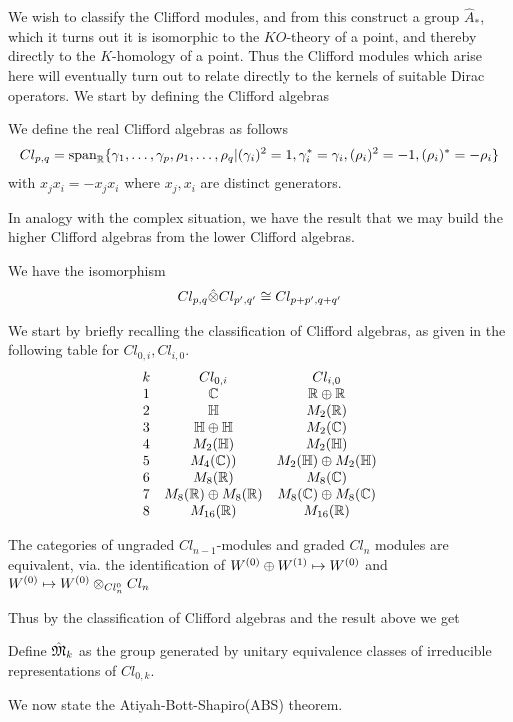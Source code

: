 We wish to classify the Clifford modules, and from this construct a group $\hat{A}_*$, which it turns out it is isomorphic to the $KO$-theory of a point, and thereby directly to the $K$-homology of a point. Thus the Clifford modules which arise here will eventually turn out to relate directly to the kernels of suitable Dirac operators. 
We start by defining the Clifford algebras
\begin{definition}
	We define the real Clifford algebras as follows 
	\begin{align*}
		Cl_{p,q}=\operatorname{span}_{\mathbb{R}}\{\gamma_1,\dots,\gamma_p,\rho_1,\dots,\rho_q| (\gamma_i)^2=1,\gamma_i^*=\gamma_i,(\rho_i)^{2}=-1,(\rho_i)^*=-\rho_i\}
	\end{align*}
	with $x_jx_i=-x_jx_i$ where $x_j,x_i$ are distinct generators. 
\end{definition}
In analogy with the complex situation, we have the result that we may build the higher Clifford algebras from the lower Clifford algebras. 
\begin{lemma}
	We have the isomorphism
	\begin{align*}
		Cl_{p,q}\hat{\otimes} Cl_{p',q'}\cong Cl_{p+p',q+q'}
	\end{align*}
\end{lemma}
 We start by briefly recalling the classification of Clifford algebras, as given in the following table for $Cl_{0,i},Cl_{i,0}$. 
			\begin{align*}
			\begin{array}{c c c} 
			k  & Cl_{0,i} & Cl_{i,0} \\
			1 & \mathbb{C} & \mathbb{R}\oplus \mathbb{R} \\
			2 & \mathbb{H} & M_{2}(\mathbb{R}) \\
			3 & \mathbb{H}\oplus \mathbb{H} & M_{2}(\mathbb{C}) \\
			4 & M_2(\mathbb{H}) & M_2(\mathbb{H})  \\
			5 & M_4(\mathbb{C})) & M_2(\mathbb{H}) \oplus M_2(\mathbb{H})  \\
			6 & M_{8}(\mathbb{R}) & M_8(\mathbb{C}) \\ 
			7 & M_8(\mathbb{R})\oplus M_8 (\mathbb{R}) & M_8(\mathbb{C})\oplus M_8(\mathbb{C})  \\
			8 & M_{16}(\mathbb{R}) & M_{16}(\mathbb{R})
			\end{array}
			\end{align*}
\begin{proposition}\label{equivalentcliff}
	The categories of ungraded $Cl_{n-1}$-modules and graded $Cl_n$ modules are equivalent, via. the identification of $W^{(0)}\oplus W^{(1)} \mapsto W^{(0)}$ and $W^{(0)}\mapsto W^{(0)}\otimes_{Cl_n^0} Cl_n$
\end{proposition}
Thus by the classification of Clifford algebras and the result above we get
\begin{definition}\label{mk}
	Define $\hat{\mathfrak{M}}_k$ as the group generated by unitary equivalence classes of irreducible representations of $Cl_{0,k}$. 
\end{definition}
We now state the Atiyah-Bott-Shapiro(ABS) theorem.

